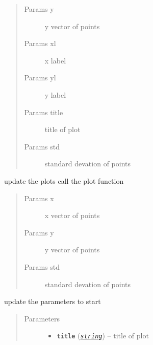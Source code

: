 \documentclass[letterpaper,10pt,english]{sphinxmanual}
\begin{document}
\begin{fulllineitems}
\begin{fulllineitems}
\begin{quote}
\begin{description}
\item[{Params y}] \leavevmode
y vector of points

\item[{Params xl}] \leavevmode
x label

\item[{Params yl}] \leavevmode
y label

\item[{Params title}] \leavevmode
title of plot

\item[{Params std}] \leavevmode
standard devation of points

\end{description}\end{quote}

\end{fulllineitems}


\begin{fulllineitems}
\label{PopPlot:Visualplotterwidget.PopPlot.update}
update the plots call the plot function
\begin{quote}\begin{description}
\item[{Params x}] \leavevmode
x vector of points

\item[{Params y}] \leavevmode
y vector of points

\item[{Params std}] \leavevmode
standard devation of points

\end{description}\end{quote}

\end{fulllineitems}


\begin{fulllineitems}
\label{PopPlot:Visualplotterwidget.PopPlot.update_init}
update the parameters to start
\begin{quote}\begin{description}
\item[{Parameters}] \leavevmode\begin{itemize}
\item {} 
\textbf{\texttt{title}} (\href{https://docs.python.org/library/string.html\#module-string}{\emph{\texttt{string}}}) -- title of plot


\end{itemize}
\end{description}
\end{quote}
\end{fulllineitems}
\end{fulllineitems}
\end{document}
